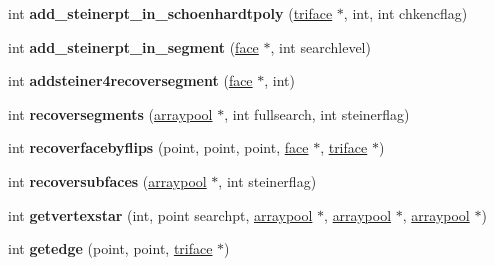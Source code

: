 \begin{DoxyCompactItemize}
\item 
\hypertarget{classtetgenmesh_acb5fc751eaa4a4ddffbebedfa7b7382a}{int {\bfseries add\-\_\-steinerpt\-\_\-in\-\_\-schoenhardtpoly} (\hyperlink{classtetgenmesh_1_1triface}{triface} $\ast$, int, int chkencflag)}\label{classtetgenmesh_acb5fc751eaa4a4ddffbebedfa7b7382a}

\item 
\hypertarget{classtetgenmesh_a3de6e9d82e74671af7f038043b5e9bcc}{int {\bfseries add\-\_\-steinerpt\-\_\-in\-\_\-segment} (\hyperlink{classtetgenmesh_1_1face}{face} $\ast$, int searchlevel)}\label{classtetgenmesh_a3de6e9d82e74671af7f038043b5e9bcc}

\item 
\hypertarget{classtetgenmesh_a9d878a0e64588b0471a58e534affea8e}{int {\bfseries addsteiner4recoversegment} (\hyperlink{classtetgenmesh_1_1face}{face} $\ast$, int)}\label{classtetgenmesh_a9d878a0e64588b0471a58e534affea8e}

\item 
\hypertarget{classtetgenmesh_a50e12e269b11573e6e1b91347ad19b37}{int {\bfseries recoversegments} (\hyperlink{classtetgenmesh_1_1arraypool}{arraypool} $\ast$, int fullsearch, int steinerflag)}\label{classtetgenmesh_a50e12e269b11573e6e1b91347ad19b37}

\item 
\hypertarget{classtetgenmesh_a38c7fc92a1ced3f4885006837a83c2e6}{int {\bfseries recoverfacebyflips} (point, point, point, \hyperlink{classtetgenmesh_1_1face}{face} $\ast$, \hyperlink{classtetgenmesh_1_1triface}{triface} $\ast$)}\label{classtetgenmesh_a38c7fc92a1ced3f4885006837a83c2e6}

\item 
\hypertarget{classtetgenmesh_ace09080e4f274e0a48cd1728475878c9}{int {\bfseries recoversubfaces} (\hyperlink{classtetgenmesh_1_1arraypool}{arraypool} $\ast$, int steinerflag)}\label{classtetgenmesh_ace09080e4f274e0a48cd1728475878c9}

\item 
\hypertarget{classtetgenmesh_a9ba3540239e05588c5a2021b15d89a8e}{int {\bfseries getvertexstar} (int, point searchpt, \hyperlink{classtetgenmesh_1_1arraypool}{arraypool} $\ast$, \hyperlink{classtetgenmesh_1_1arraypool}{arraypool} $\ast$, \hyperlink{classtetgenmesh_1_1arraypool}{arraypool} $\ast$)}\label{classtetgenmesh_a9ba3540239e05588c5a2021b15d89a8e}

\item 
\hypertarget{classtetgenmesh_ae680a6f607f14655b0078e066a95bc34}{int {\bfseries getedge} (point, point, \hyperlink{classtetgenmesh_1_1triface}{triface} $\ast$)}\label{classtetgenmesh_ae680a6f607f14655b0078e066a95bc34}


\end{DoxyCompactItemize}
